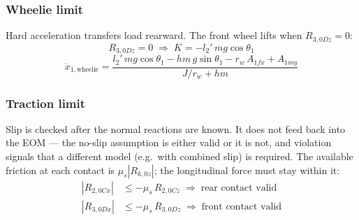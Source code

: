 \documentclass[10pt]{extarticle}
\numberwithin{equation}{subsubsection}
\begin{document}
\subsubsection{Wheelie limit}

Hard acceleration transfers load rearward. The front wheel lifts when $R_{3,0Dz} = 0$:
\begin{equation}
    R_{3,0Dz} = 0 \;\Rightarrow\; K = -l_2'\,mg\cos\theta_1
\end{equation}
\begin{equation}
    \ddot{x}_{1,\text{wheelie}} = \frac{l_2'\,mg\cos\theta_1 - hm\,g\sin\theta_1 - r_w\,A_{1fx} + A_{1my}}{J/r_w + hm}
\end{equation}

\subsubsection{Traction limit}

Slip is checked after the normal reactions are known. It does not feed back into the EOM — the no-slip assumption is either valid or it is not, and violation signals that a different model (e.g.\ with combined slip) is required. The available friction at each contact is $\mu_s |R_{k,0z}|$; the longitudinal force must stay within it:
\begin{align}
    \left|R_{2,0Cx}\right| &\le -\mu_s\,R_{2,0Cz} \;\Rightarrow\; \text{rear contact valid} \\
    \left|R_{3,0Dx}\right| &\le -\mu_s\,R_{3,0Dz} \;\Rightarrow\; \text{front contact valid}
\end{align}
\end{document}
